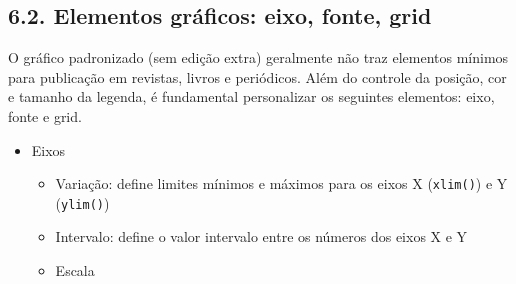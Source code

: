 \documentclass[
]{book}
\begin{document}
\hypertarget{elementos-gruxe1ficos-eixo-fonte-grid}{%
\subsection{6.2. Elementos gráficos: eixo, fonte, grid}\label{elementos-gruxe1ficos-eixo-fonte-grid}}

O gráfico padronizado (sem edição extra) geralmente não traz elementos mínimos para publicação em revistas, livros e periódicos. Além do controle da posição, cor e tamanho da legenda, é fundamental personalizar os seguintes elementos: eixo, fonte e grid.

\begin{itemize}
\item
  Eixos

  \begin{itemize}
  \item
    Variação: define limites mínimos e máximos para os eixos X (\texttt{xlim()}) e Y (\texttt{ylim()})
  \item
    Intervalo: define o valor intervalo entre os números dos eixos X e Y
  \item
    Escala
  \end{itemize}
\end{itemize}
\end{document}
